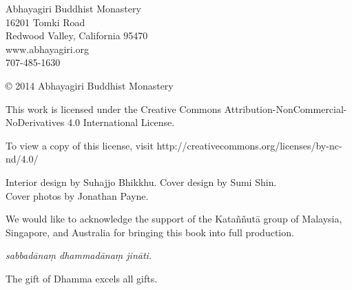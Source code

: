 \thispagestyle{empty}
{\footnotesize\raggedright
{}

\vspace{1em}
Abhayagiri Buddhist Monastery\\
16201 Tomki Road\\
Redwood Valley, California 95470\\
www.abhayagiri.org\\
707-485-1630

\vspace{1em}
\copyright{} 2014 Abhayagiri Buddhist Monastery

\vspace{1em}
This work is licensed under the Creative Commons
Attribution-NonCommercial-NoDerivatives 4.0 International License.

To view a copy of this license, visit
http://creativecommons.org/licenses/by-nc-nd/4.0/

\vspace{1em}

Interior design by Suhajjo Bhikkhu. Cover design by Sumi Shin.\\
Cover photos by Jonathan Payne. 


\vspace{1em}

We would like to acknowledge the support of the Kataññutā group of
Malaysia, Singapore, and Australia for bringing this book into full
production.

\vspace{1em}

\textit{sabbadānaṃ dhammadānaṃ jināti.}

The gift of Dhamma excels all gifts.
}

\clearpage
